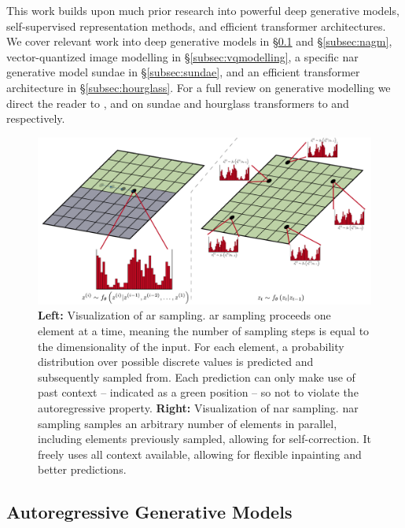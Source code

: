 This work builds upon much prior research into powerful deep generative models,
self-supervised representation methods, and efficient transformer architectures.
We cover relevant work into deep generative models in \S\ref{subsec:agm} and
\S\ref{subsec:nagm}, vector-quantized image modelling in
\S\ref{subsec:vqmodelling}, a specific \acrshort{nar} generative model
\gls{sundae} in \S\ref{subsec:sundae}, and an efficient transformer architecture
in \S\ref{subsec:hourglass}. For a full review on generative modelling we direct
the reader to \citet{bondtaylor2021review}, and on \gls{sundae} and hourglass
transformers to \citet{savinov2022stepunrolled} and
\citet{nawrot2021hierarchical} respectively.

\begin{figure}[ht!]
    \centering
    \includegraphics[width=\textwidth]{figures/AR-NAR.pdf}
    \caption{
        \textbf{Left:} Visualization of \acrfull{ar} sampling. \gls{ar} sampling
        proceeds one element at a time, meaning the number of sampling steps is
        equal to the dimensionality of the input. For each element, a
        probability distribution over possible discrete values is predicted and
        subsequently sampled from. Each prediction can only make use of past
        context -- indicated as a green position -- so not to violate the
        autoregressive property.
        \textbf{Right:} Visualization of \acrfull{nar} sampling. \Gls{nar}
        sampling samples an arbitrary number of elements in parallel, including
        elements previously sampled, allowing for self-correction. It freely
        uses all context available, allowing for flexible inpainting and
        better predictions.
    }
\end{figure}

\subsection{Autoregressive Generative Models}
\label{subsec:agm}

